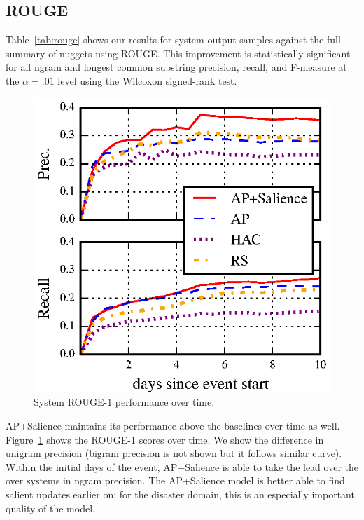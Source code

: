 
\subsection{ROUGE}


Table~\ref{tab:rouge} shows our results for system output samples against the full summary of nuggets using ROUGE. 
This improvement is statistically significant for all ngram and longest common substring
precision, recall, and F-measure
at the $\alpha = .01$ level
using the Wilcoxon signed-rank test. 

\begin{figure}
    \includegraphics[]{rouge-time.eps}
\caption{System ROUGE-1 performance over time.}
\label{fig:trouge}
\end{figure}


AP+Salience maintains its performance above the baselines over time as well. Figure~\ref{fig:trouge}
shows the ROUGE-1 scores over time. 
We show the difference in unigram precision (bigram precision is not shown but it follows
similar curve).
Within the initial days of the event, AP+Salience is able to take the lead over the over 
systems in ngram precision. 
The AP+Salience model is better able to find salient updates
earlier on; for the disaster domain, this is an especially important quality of the model. 

